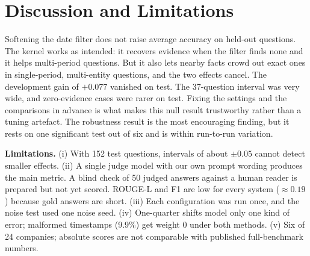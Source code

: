 \section{Discussion and Limitations}
Softening the date filter does not raise average accuracy on held-out questions. The kernel works as intended: it recovers evidence when the filter finds none and it helps multi-period questions. But it also lets nearby facts crowd out exact ones in single-period, multi-entity questions, and the two effects cancel. The development gain of $+0.077$ vanished on test. The 37-question interval was very wide, and zero-evidence cases were rarer on test. Fixing the settings and the comparisons in advance is what makes this null result trustworthy rather than a tuning artefact. The robustness result is the most encouraging finding, but it rests on one significant test out of six and is within run-to-run variation.

\textbf{Limitations.} (i) With 152 test questions, intervals of about $\pm 0.05$ cannot detect smaller effects. (ii) A single judge model with our own prompt wording produces the main metric. A blind check of 50 judged answers against a human reader is prepared but not yet scored. ROUGE-L and F1 are low for every system ($\approx 0.19$) because gold answers are short. (iii) Each configuration was run once, and the noise test used one noise seed. (iv) One-quarter shifts model only one kind of error; malformed timestamps (9.9\%) get weight 0 under both methods. (v) Six of 24 companies; absolute scores are not comparable with published full-benchmark numbers.
